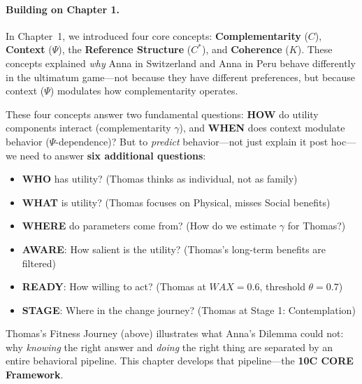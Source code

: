 \paragraph{Building on Chapter 1.}
In Chapter~1, we introduced four core concepts: \textbf{Complementarity} ($C$), \textbf{Context} ($\Psi$), the \textbf{Reference Structure} ($C^*$), and \textbf{Coherence} ($K$). These concepts explained \emph{why} Anna in Switzerland and Anna in Peru behave differently in the ultimatum game---not because they have different preferences, but because context ($\Psi$) modulates how complementarity operates.

These four concepts answer two fundamental questions: \textbf{HOW} do utility components interact (complementarity $\gamma$), and \textbf{WHEN} does context modulate behavior ($\Psi$-dependence)? But to \emph{predict} behavior---not just explain it post hoc---we need to answer \textbf{six additional questions}:

\begin{itemize}[nosep]
    \item \textbf{WHO} has utility? (Thomas thinks as individual, not as family)
    \item \textbf{WHAT} is utility? (Thomas focuses on Physical, misses Social benefits)
    \item \textbf{WHERE} do parameters come from? (How do we estimate $\gamma$ for Thomas?)
    \item \textbf{AWARE}: How salient is the utility? (Thomas's long-term benefits are filtered)
    \item \textbf{READY}: How willing to act? (Thomas at $WAX = 0.6$, threshold $\theta = 0.7$)
    \item \textbf{STAGE}: Where in the change journey? (Thomas at Stage 1: Contemplation)
\end{itemize}

\noindent Thomas's Fitness Journey (above) illustrates what Anna's Dilemma could not: why \emph{knowing} the right answer and \emph{doing} the right thing are separated by an entire behavioral pipeline. This chapter develops that pipeline---the \textbf{10C CORE Framework}.

